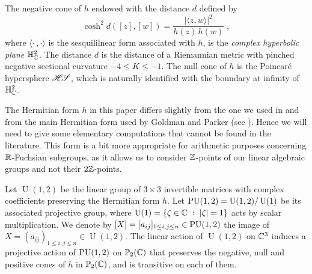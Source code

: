 \documentclass[11pt]{article}
\begin{document}
The negative cone of $h$ endowed with the distance $d$ defined by
$$
\cosh^2d([z],[w])=\frac{|\langle z,w\rangle|^2}{h(z)\,h(w)}\;,
$$
where $\langle \cdot\,,\cdot\rangle$ is the sesquililnear form
associated with $h$, is the {\em complex hyperbolic plane} ${{\mathbb H}}^2_{\mathbb C}$. The
distance $d$ is the distance of a Riemannian metric with pinched
negative sectional curvature $-4\le K\le -1$.  The null cone of $h$ is
the Poincar\'e hypersphere $\mathscr{H\!S}$, which is naturally identified
with the boundary at infinity of ${{\mathbb H}}^2_{\mathbb C}$.


The Hermitian form $h$ in this paper differs slightly from the one we
used in \cite{ParPau10GT,ParPau17MA,ParPau17MS} and from the main
Hermitian form used by Goldman and Parker (see \cite{Goldman99,
  Parker12, Parker16}).  Hence we will need to give some elementary
computations that cannot be found in the literature. This form is a
bit more appropriate for arithmetic purposes concerning ${\mathbb R}$-Fuchsian
subgroups, as it allows us to consider ${\mathbb Z}$-points of our linear
algebraic groups and not their $2{\mathbb Z}$-points.


Let $\operatorname{U}(1,2)$ be the linear group of $3\times3$
invertible matrices with complex coefficients preserving the Hermitian
form $h$. Let $\operatorname{PU}(1,2)=\operatorname{U}(1,2)/ \operatorname{U}(1)$ be
its associated projective group, where $\operatorname{U}(1)=
\{\zeta\in{\mathbb C} \;:\;|\zeta|=1\}$ acts by scalar multiplication. We
denote by $[X]=[a_{ij}]_{1\leq i,j\leq n}\in\operatorname{PU}(1,2)$ the image of
$X=(a_{ij})_{1\leq i,j\leq n}\in\operatorname{U}(1,2)$. The linear
action of $\operatorname{U}(1,2)$ on ${\mathbb C}^3$ induces a projective
action of $\operatorname{PU}(1,2)$ on ${\mathbb P}_2({\mathbb C})$ that preserves the negative, null
and positive cones of $h$ in ${\mathbb P}_2({\mathbb C})$, and is transitive on each
of them.
\end{document}
